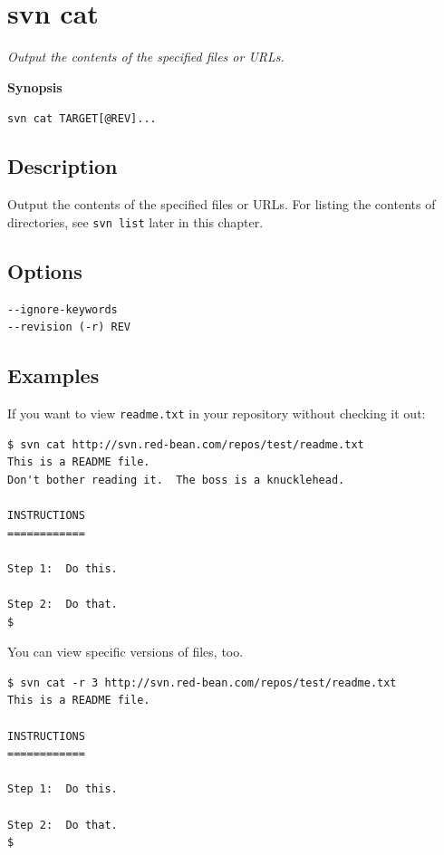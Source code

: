 \section{svn cat}\label{svn.ref.svn.c.cat}

\emph{Output the contents of the specified files or URLs.}

\textbf{Synopsis}

\texttt{svn\ cat\ TARGET{[}@REV{]}...}

\subsection{Description}

Output the contents of the specified files or URLs. For listing the
contents of directories, see \texttt{svn\ list} later in this chapter.

\subsection{Options}

\begin{verbatim}
--ignore-keywords
--revision (-r) REV
\end{verbatim}

\subsection{Examples}

If you want to view \texttt{readme.txt} in your repository without
checking it out:

\begin{verbatim}
$ svn cat http://svn.red-bean.com/repos/test/readme.txt
This is a README file.
Don't bother reading it.  The boss is a knucklehead.
 
INSTRUCTIONS
============

Step 1:  Do this.

Step 2:  Do that.
$
\end{verbatim}

You can view specific versions of files, too.

\begin{verbatim}
$ svn cat -r 3 http://svn.red-bean.com/repos/test/readme.txt
This is a README file.
 
INSTRUCTIONS
============

Step 1:  Do this.

Step 2:  Do that.
$
\end{verbatim}

